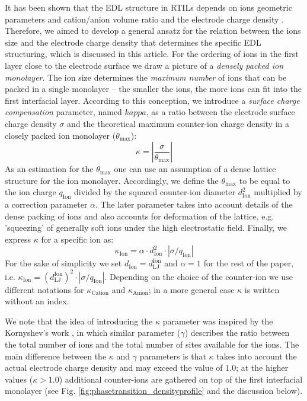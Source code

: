\documentclass[final,5p,times,twocolumn]{elsarticle}
\begin{document}
It has been shown that the EDL structure in RTILs depends on ions geometric parameters and cation/anion volume ratio and the electrode charge density \cite{Fedorov2008a,Fedorov2010,Georgi2010,Lynden-Bell2012,Vatamanu2011}. Therefore, we aimed to develop a general ansatz for the relation between the ions size and the electrode charge density that determines the specific EDL structuring, which is discussed in this article. For the ordering of ions in the first layer close to the electrode surface we draw a picture of a \textit{densely packed ion monolayer}. The ion size determines the \textit{maximum number} of ions that can be packed in a single monolayer -- the smaller the ions, the more ions can fit into the first interfacial layer. According to this conception, we introduce a \textit{surface charge compensation} parameter, named $kappa$, as a ratio between the electrode surface charge density $\sigma$ and the theoretical maximum counter-ion charge density in a closely packed ion monolayer ($\theta_\mathrm{max}$):
\begin{equation}
\label{eq:kappa} \kappa = \left| \frac{\sigma}{\theta_\mathrm{max}} \right|
\end{equation}
As an estimation for the $\theta_\mathrm{max}$ one can use an assumption of a dense lattice structure for the ion monolayer. Accordingly, we define the $\theta_\mathrm{max}$ to be equal to the ion charge $q_{\mathrm{Ion}}$ divided by the squared counter-ion diameter $d_\mathrm{Ion}^2$ multiplied by a correction parameter $\alpha$. The later parameter takes into account details of the dense packing of ions and also accounts for deformation of the lattice, e.g. 'squeezing' of generally soft ions under the high electrostatic field. Finally, we express $\kappa$ for a specific ion as: 
\begin{equation}
\kappa_{\mathrm{Ion}} = \alpha \cdot d_\mathrm{Ion}^2 \cdot \left| {\sigma}/{q_\mathrm{Ion}} \right|
\end{equation}
For the sake of simplicity we set $d_\mathrm{Ion} = d_\mathrm{LJ}^\mathrm{Ion}$ and $\alpha=1$ for the rest of the paper, i.e. $\kappa_{\mathrm{Ion}} = \left(d_\mathrm{LJ}^\mathrm{Ion}\right)^2 \cdot \left| {\sigma}/{q_\mathrm{Ion}} \right|$.  Depending on the choice of the counter-ion we use different notations for $\kappa_{\mathrm{Cation}}$ and $\kappa_{\mathrm{Anion}}$; in a more general case $\kappa$ is written without an index. 

We note that the idea of introducing the $\kappa$ parameter was inspired by the Kornyshev's work \cite{Kornyshev2007}, in which similar parameter ($\gamma$) describes the ratio between the total number of ions and the total number of sites available for the ions. The main difference between the $\kappa$ and $\gamma$ parameters is that $\kappa$ takes into account the actual electrode charge density and may exceed the value of $1.0$; at the higher values ($\kappa>1.0$) additional counter-ions are gathered on top of the first interfacial monolayer (see  Fig. \ref{fig:phasetransition_densityprofile} and the discussion below).
\end{document}
